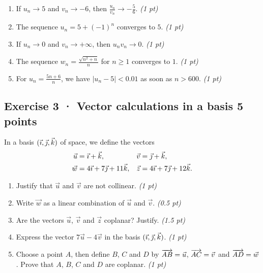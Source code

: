 \begin{enumerate}

\item If $u_n\to 5$ and $v_n\to-6$, then $\frac{u_n}{v_n}\to-\frac{5}{6}$. \hfill\textit{(1 pt)}

\item The sequence $u_n=5+(-1)^n$ converges to $5$. \hfill\textit{(1 pt)}

\item If $u_n\to0$ and $v_n\to+\infty$, then $u_nv_n\to0$. \hfill\textit{(1 pt)}

\item The sequence $w_n=\frac{\sqrt{n^2+n}}{n}$ for $n\ge1$ converges to $1$. \hfill\textit{(1 pt)}

\item For $u_n=\frac{5n+6}{n}$, we have $|u_n-5|<0.01$ as soon as $n> 600$. \hfill\textit{(1 pt)}

\end{enumerate}

\clearpage{}\par

\subsection*{Exercise 3 · Vector calculations in a basis \hfill 5 points}In a basis $(\vec{\imath},\vec{\jmath},\vec k)$ of space, we define the vectors
\[\begin{aligned}\vec u&=\vec{\imath}+\vec k,&\vec v&=\vec{\jmath}+\vec k,\\
\vec w&=4\vec{\imath}+7\vec{\jmath}+11\vec k,&\vec z&=4\vec{\imath}+7\vec{\jmath}+12\vec k.\end{aligned}\]

\begin{enumerate}

\item Justify that $\vec u$ and $\vec v$ are not collinear. \hfill\textit{(1 pt)}

\item Write $\vec w$ as a linear combination of $\vec u$ and $\vec v$. \hfill\textit{(0.5 pt)}

\item Are the vectors $\vec u$, $\vec v$ and $\vec z$ coplanar? Justify. \hfill\textit{(1.5 pt)}

\item Express the vector $7\vec u-4\vec v$ in the basis $(\vec{\imath},\vec{\jmath},\vec k)$. \hfill\textit{(1 pt)}

\item Choose a point $A$, then define $B$, $C$ and $D$ by $\overrightarrow{AB}=\vec u$, $\overrightarrow{AC}=\vec v$ and $\overrightarrow{AD}=\vec w$. Prove that $A$, $B$, $C$ and $D$ are coplanar. \hfill\textit{(1 pt)}

\end{enumerate}

